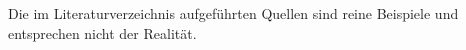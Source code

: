 \documentclass[titlepage,table]{article}
\begin{document}
% 

\pagestyle{fancy}                                    %
\fancyfoot{}                                         %
\renewcommand{\footrulewidth}{0.4pt}                 %
\fancyhead{}                                         %
\renewcommand{\headrulewidth}{0.4pt}                 %
\fancyhead[R]{\nouppercase{\leftmark}}                             %

\setcounter{tocdepth}{3}                            %
\setcounter{secnumdepth}{3}                         %
\tableofcontents
\newpage
\listoftables
\listoffigures



\newpage



\newpage
\nocite{*}                 %
\label{sec:literaturverzeichnis}

Die im Literaturverzeichnis aufgeführten Quellen sind reine Beispiele und entsprechen nicht der Realität.
\end{document}
